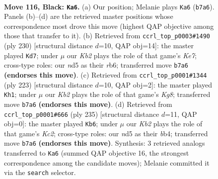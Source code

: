 \documentclass[11pt]{article}
\begin{document}
\clearpage

\begin{figure}[p]\centering
\begin{subfigure}{0.46\textwidth}\centering
\resizebox{\linewidth}{!}{%
\newchessgame
\chessboard[
  setfen={3B4/1k6/8/3N1q2/2K5/8/8/8 b - - 1 116},
  showmover=false,
  pgfstyle=straightmove, color=movearrow, markmove={b7-a6}
]}
\caption{}
\end{subfigure}\hfill
\begin{subfigure}{0.46\textwidth}\centering
\resizebox{\linewidth}{!}{%
\newchessgame
\chessboard[
  setfen={8/4K3/1r6/k7/3Q4/8/8/8 w - - 7 116},
  showmover=false,
  pgfstyle=straightmove, color=movearrow, markmove={e7-d7}
]}
\caption{}
\end{subfigure}
\\[4pt]
\begin{subfigure}{0.46\textwidth}\centering
\resizebox{\linewidth}{!}{%
\newchessgame
\chessboard[
  setfen={8/8/8/8/8/6KN/4B3/6k1 b - - 51 112},
  showmover=false,
  pgfstyle=straightmove, color=movearrow, markmove={g1-h1}
]}
\caption{}
\end{subfigure}\hfill
\begin{subfigure}{0.46\textwidth}\centering
\resizebox{\linewidth}{!}{%
\newchessgame
\chessboard[
  setfen={8/2k5/8/3K4/1B6/8/4B3/8 b - - 14 118},
  showmover=false,
  pgfstyle=straightmove, color=movearrow, markmove={c7-b6}
]}
\caption{}
\end{subfigure}
\caption{\textbf{Move 116, Black: \texttt{Ka6}.} (a) Our position; Melanie plays \texttt{Ka6} (\texttt{b7a6}). Panels (b)--(d) are the retrieved master positions whose correspondence most drove this move (highest QAP objective among those that transfer to it). (b) Retrieved from \texttt{ccrl\_top\_p0003\#1490} (ply 230) [structural distance $d$=10, QAP obj=14]: the master played \texttt{Kd7}; under $\mu$ our \emph{Kb2} plays the role of that game's \emph{Ke7}; cross-type roles: our \emph{n}d5 as their \emph{r}b6; transferred move \texttt{b7a6} \textbf{(endorses this move)}. (c) Retrieved from \texttt{ccrl\_top\_p0001\#1344} (ply 223) [structural distance $d$=10, QAP obj=2]: the master played \texttt{Kh1}; under $\mu$ our \emph{Kb2} plays the role of that game's \emph{Kg8}; transferred move \texttt{b7a6} \textbf{(endorses this move)}. (d) Retrieved from \texttt{ccrl\_top\_p0001\#666} (ply 235) [structural distance $d$=11, QAP obj=0]: the master played \texttt{Kb6}; under $\mu$ our \emph{Kb2} plays the role of that game's \emph{Kc2}; cross-type roles: our \emph{n}d5 as their \emph{b}b4; transferred move \texttt{b7a6} \textbf{(endorses this move)}. Synthesis: 3 retrieved analogs transferred to \texttt{Ka6} (summed QAP objective 16, the strongest correspondence among the candidate moves); Melanie committed it via the \texttt{search} selector.}
\label{fig:thought-m231}
\end{figure}
\end{document}
